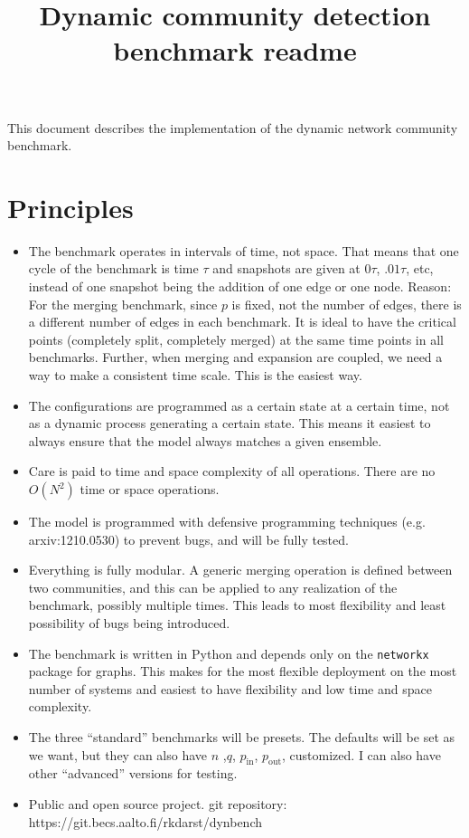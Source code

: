 \documentclass{article}
\title{Dynamic community detection benchmark readme}
\def\pin{p_\mathrm{in}}
\def\pout{p_\mathrm{out}}
\begin{document}
\maketitle

This document describes the implementation of the dynamic network
community benchmark.


\section{Principles}
\label{sec:principles}

\begin{itemize}
\item The benchmark operates in intervals of time, not space.  That
  means that one cycle of the benchmark is time $\tau$ and snapshots
  are given at $0\tau$, $.01\tau$, etc, instead of one snapshot being
  the addition of one edge or one node.  Reason: For the merging
  benchmark, since $p$ is fixed, not the number of edges, there is a
  different number of edges in each benchmark.  It is ideal to have
  the critical points (completely split, completely merged) at the
  same time points in all benchmarks.  Further, when merging and
  expansion are coupled, we need a way to make a consistent time
  scale.  This is the easiest way.
\item The configurations are programmed as a certain state at a certain
  time, not as a dynamic process generating a certain state.  This
  means it easiest to always ensure that the model always matches a
  given ensemble.
\item Care is paid to time and space complexity of all operations.
  There are no $O(N^2)$ time or space operations.
\item The model is programmed with defensive programming techniques
  (e.g. arxiv:1210.0530) to prevent bugs, and will be fully tested.
\item Everything is fully modular.  A generic merging operation is
  defined between two communities, and this can be applied to any
  realization of the benchmark, possibly multiple times.  This leads
  to most flexibility and least possibility of bugs being introduced.
\item The benchmark is written in Python and depends only on the
  \texttt{networkx} package for graphs.  This makes for the most
  flexible deployment on the most number of systems and easiest to
  have flexibility and low time and space complexity.
\item The three ``standard'' benchmarks will be presets.  The defaults
  will be set as we want, but they can also have $n$ ,$q$, $\pin$,
  $\pout$, customized.  I can also have other ``advanced'' versions
  for testing.
\item Public and open source project.  git repository:
  https://git.becs.aalto.fi/rkdarst/dynbench
\end{itemize}
\end{document}
